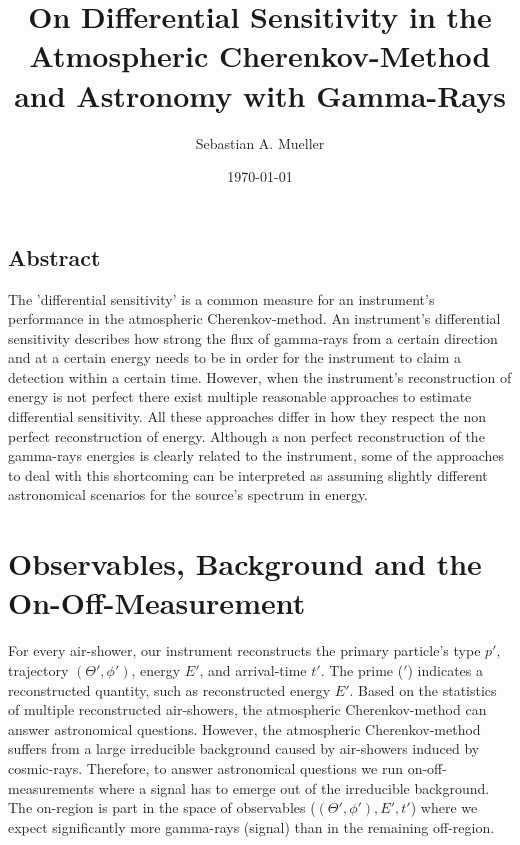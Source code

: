 \documentclass{article}%
\title{
    On Differential Sensitivity in the Atmospheric Cherenkov-Method and Astronomy with Gamma-Rays
}%
\author{Sebastian A. Mueller}%
\date{\today{}}%
\begin{document}
%
    \maketitle%
    \newcommand{\dd}[2]{\frac{\mathrm{d}#1}{\mathrm{d}#2}}
    \subsection*{Abstract}
        The 'differential sensitivity' is a common measure for an instrument's performance in the atmospheric Cherenkov-method.
        An instrument's differential sensitivity describes how strong the flux of gamma-rays from a certain direction and at a certain energy needs to be in order for the instrument to claim a detection within a certain time.
        However, when the instrument's reconstruction of energy is not perfect there exist multiple reasonable approaches to estimate differential sensitivity.
        All these approaches differ in how they respect the non perfect reconstruction of energy.
        Although a non perfect reconstruction of the gamma-rays energies is clearly related to the instrument, some of the approaches to deal with this shortcoming can be interpreted as assuming slightly different astronomical scenarios for the source's spectrum in energy.
    \section{Observables, Background and the On-Off-Measurement}
        \label{SecObservablesAndOnOff}
        For every air-shower, our instrument reconstructs the primary particle's type $p'$, trajectory $(\Theta', \phi')$, energy $E'$, and arrival-time $t'$.
        The prime ($'$) indicates a reconstructed quantity, such as reconstructed energy $E'$.
        Based on the statistics of multiple reconstructed air-showers, the atmospheric Cherenkov-method can answer astronomical questions.
        However, the atmospheric Cherenkov-method suffers from a large irreducible background caused by air-showers induced by cosmic-rays.
        Therefore, to answer astronomical questions we run on-off-measurements where a signal has to emerge out of the irreducible background.
        The on-region is part in the space of observables ($(\Theta', \phi'), E', t'$) where we expect significantly more gamma-rays (signal) than in the remaining off-region.
\end{document}
